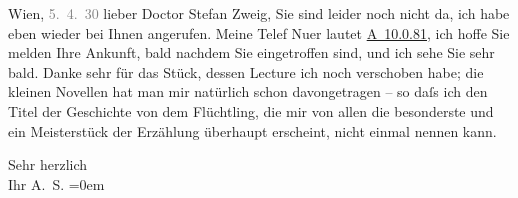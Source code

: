 \pstart
           \raggedleft{}{\pb}Wien, \textcolor{gray}{5. 4. 30}\pend
           \vspace{0.5em}
\pstart
           lieber Doctor Stefan Zweig, Sie sind leider noch nicht da, ich habe
               eben wieder bei Ihnen angerufen. Meine Telef Nu{\geminationm}er
               lautet \textsc{\uline{A 10.0.81}}, ich hoffe Sie melden Ihre Ankunft, bald nachdem Sie eingetroffen sind, und
               ich sehe Sie sehr bald. Danke sehr für das Stück, dessen Lecture ich noch verschoben habe; die kleinen
                  Novellen hat man mir
               natürlich schon {\pb}davongetragen – so daſs ich den Titel der
                  Geschichte von dem
                  Flüchtling, die mir von allen die besonderste und ein Meisterstück der
               Erzählung überhaupt erscheint, nicht einmal nennen kann.\pend
           
\pstart
           Sehr herzlich{\\[\baselineskip]}Ihr \spacefill\mbox{A. S.}\pend
           \leftskip=0em{}\endnumbering{}  \newcommand{\dateiname}{L03737}\newcommand{\titel}{Arthur Schnitzler an Stefan Zweig, 5. 4. 1930}\newcommand{\editorInnen}{Selma Jahnke und Martin Anton Müller}

